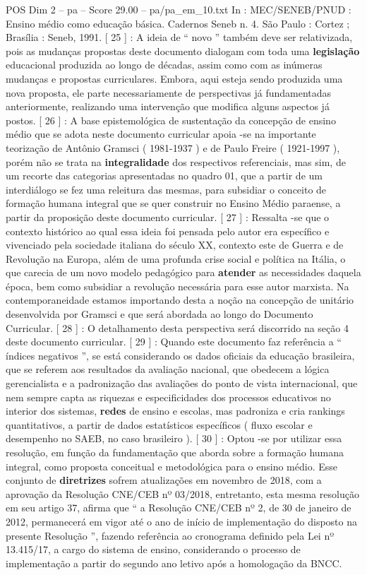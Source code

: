 \begin{textsample}{POS Dim 2 – pa – Score 29.00 – pa/pa\_em\_10.txt}
In : MEC/SENEB/PNUD : Ensino médio como educação básica.
Cadernos Seneb n. 4.
São Paulo : Cortez ; Brasília : Seneb, 1991. [ 25 ] : A ideia de “ novo ” também deve ser relativizada, pois as mudanças propostas deste documento dialogam com toda uma \textbf{legislação} educacional produzida ao longo de décadas, assim como com as inúmeras mudanças e propostas curriculares.
Embora, aqui esteja sendo produzida uma nova proposta, ele parte necessariamente de perspectivas já fundamentadas anteriormente, realizando uma intervenção que modifica alguns aspectos já postos. [ 26 ] : A base epistemológica de sustentação da concepção de ensino médio que se adota neste documento curricular apoia -se na importante teorização de Antônio Gramsci ( 1981-1937 ) e de Paulo Freire ( 1921-1997 ), porém não se trata na \textbf{integralidade} dos respectivos referenciais, mas sim, de um recorte das categorias apresentadas no quadro 01, que a partir de um interdiálogo se fez uma releitura das mesmas, para subsidiar o conceito de formação humana integral que se quer construir no Ensino Médio paraense, a partir da proposição deste documento curricular. [ 27 ] : Ressalta -se que o contexto histórico ao qual essa ideia foi pensada pelo autor era específico e vivenciado pela sociedade italiana do século XX, contexto este de Guerra e de Revolução na Europa, além de uma profunda crise social e política na Itália, o que carecia de um novo modelo pedagógico para \textbf{atender} as necessidades daquela época, bem como subsidiar a revolução necessária para esse autor marxista.
Na contemporaneidade estamos importando desta a noção na concepção de unitário desenvolvida por Gramsci e que será abordada ao longo do Documento Curricular. [ 28 ] : O detalhamento desta perspectiva será discorrido na seção 4 deste documento curricular. [ 29 ] : Quando este documento faz referência a “ índices negativos ”, se está considerando os dados oficiais da educação brasileira, que se referem aos resultados da avaliação nacional, que obedecem a lógica gerencialista e a padronização das avaliações do ponto de vista internacional, que nem sempre capta as riquezas e especificidades dos processos educativos no interior dos sistemas, \textbf{redes} de ensino e escolas, mas padroniza e cria rankings quantitativos, a partir de dados estatísticos específicos ( fluxo escolar e desempenho no SAEB, no caso brasileiro ). [ 30 ] : Optou -se por utilizar essa resolução, em função da fundamentação que aborda sobre a formação humana integral, como proposta conceitual e metodológica para o ensino médio.
Esse conjunto de \textbf{diretrizes} sofrem atualizações em novembro de 2018, com a aprovação da Resolução CNE/CEB nº 03/2018, entretanto, esta mesma resolução em seu artigo 37, afirma que “ a Resolução CNE/CEB nº 2, de 30 de janeiro de 2012, permanecerá em vigor até o ano de início de implementação do disposto na presente Resolução ”, fazendo referência ao cronograma definido pela Lei nº 13.415/17, a cargo do sistema de ensino, considerando o processo de implementação a partir do segundo ano letivo após a homologação da BNCC.

\end{textsample}
